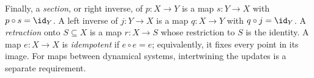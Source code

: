 Finally, a \emph{section}, or right inverse, of $p\colon X\to Y$ is a map $s\colon Y\to X$ with $p\circ s=\id_Y$. A left inverse of $j\colon Y\to X$ is a map $q\colon X\to Y$ with $q\circ j=\id_Y$. A \emph{retraction} onto $S\subseteq X$ is a map $r\colon X\to S$ whose restriction to $S$ is the identity. A map $e\colon X\to X$ is \emph{idempotent} if $e\circ e=e$; equivalently, it fixes every point in its image. For maps between dynamical systems, intertwining the updates is a separate requirement.

